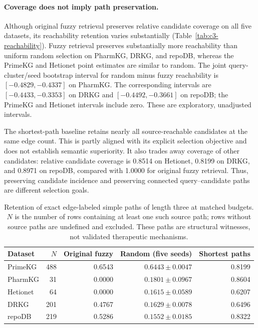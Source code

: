 \paragraph{Coverage does not imply path preservation.}
Although original fuzzy retrieval preserves relative candidate coverage on all
five datasets, its reachability retention varies substantially
(Table~\ref{tab:c3-reachability}). Fuzzy retrieval preserves substantially more
reachability than uniform random selection on PharmKG, DRKG, and repoDB, whereas
the PrimeKG and Hetionet point estimates are similar to random. The joint
query-cluster/seed bootstrap interval for random minus fuzzy reachability is
$[-0.4829,-0.4337]$ on PharmKG. The corresponding intervals are
$[-0.4433,-0.3353]$ on DRKG and $[-0.4492,-0.3661]$ on repoDB;
the PrimeKG and Hetionet intervals include zero. These are exploratory,
unadjusted intervals.

The shortest-path baseline retains nearly all source-reachable candidates at
the same edge count. This is partly aligned with its explicit selection
objective and does not establish semantic superiority. It also trades away
coverage of other candidates: relative candidate coverage is 0.8514 on
Hetionet, 0.8199 on DRKG, and 0.8971 on repoDB, compared with 1.0000 for original
fuzzy retrieval. Thus, preserving candidate incidence and preserving connected
query--candidate paths are different selection goals.

\begin{table}[t]
\centering\small
\caption{Retention of exact edge-labeled simple paths of length three at
matched budgets. $N$ is the number of rows containing at least one such source
path; rows without source paths are undefined and excluded. These paths are
structural witnesses, not validated therapeutic mechanisms.}
\label{tab:c3-path-witnesses}
\begin{tabular}{lrrrr}
\hline
Dataset & $N$ & Original fuzzy & Random (five seeds) & Shortest paths \\
\hline
PrimeKG & 488 & 0.6543 & $0.6443\pm0.0047$ & 0.8199 \\
PharmKG & 31 & 0.0000 & $0.1801\pm0.0967$ & 0.8604 \\
Hetionet & 64 & 0.0000 & $0.1615\pm0.0589$ & 0.6207 \\
DRKG & 201 & 0.4767 & $0.1629\pm0.0078$ & 0.6496 \\
repoDB & 219 & 0.5286 & $0.1552\pm0.0185$ & 0.8322 \\
\hline
\end{tabular}
\end{table}

